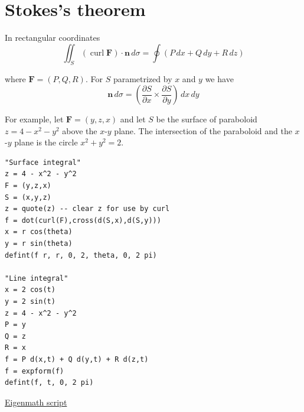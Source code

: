 

\section*{Stokes's theorem}

In rectangular coordinates
\begin{equation*}
\iint_S(\operatorname{curl}{\mathbf F})\cdot\mathbf n\,d\sigma
=\oint (P\,dx+Q\,dy+R\,dz)
\end{equation*}

where $\mathbf F=(P,Q,R)$.
For $S$ parametrized by $x$ and $y$ we have
\begin{equation*}
\mathbf n\,d\sigma=\left(
\frac{\partial S}{\partial x}\times\frac{\partial S}{\partial y}
\right)\,dx\,dy
\end{equation*}

For example,
let $\mathbf F=(y,z,x)$ and let $S$ be the surface of paraboloid $z=4-x^2-y^2$
above the $x$-$y$ plane.
The intersection of the paraboloid and the $x$-$y$ plane is the circle $x^2+y^2=2$.

{\color{blue}
\begin{verbatim}
"Surface integral"
z = 4 - x^2 - y^2
F = (y,z,x)
S = (x,y,z)
z = quote(z) -- clear z for use by curl
f = dot(curl(F),cross(d(S,x),d(S,y)))
x = r cos(theta)
y = r sin(theta)
defint(f r, r, 0, 2, theta, 0, 2 pi)

"Line integral"
x = 2 cos(t)
y = 2 sin(t)
z = 4 - x^2 - y^2
P = y
Q = z
R = x
f = P d(x,t) + Q d(y,t) + R d(z,t)
f = expform(f)
defint(f, t, 0, 2 pi)
\end{verbatim}
}

\href{https://georgeweigt.github.io/examples/stokes-theorem-demo.html}{Eigenmath script}


